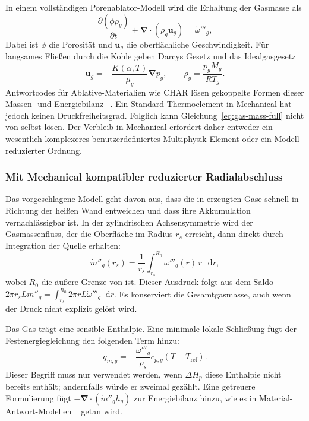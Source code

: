\documentclass[oneside,openany]{amsdtx}
\newcommand{\dd}{\mathop{}\!\mathrm{d}}
\newcommand{\pd}{\partial}
\newcommand{\vect}[1]{\bm{#1}}
\begin{document}
In einem vollständigen Porenablator-Modell wird die Erhaltung der Gasmasse als
\begin{equation}
  \frac{\pd(\phi\rho_g)}{\pd t}
  +\vect\nabla\cdot(\rho_g\vect u_g)=\dot\omega'''_g,
  \label{eq:gas-mass-full}
\end{equation}
Dabei ist \(\phi\) die Porosität und \(\vect u_g\) die oberflächliche Geschwindigkeit. Für langsames Fließen durch die Kohle geben Darcys Gesetz und das Idealgasgesetz
\begin{equation}
  \vect u_g=-\frac{K(\alpha,T)}{\mu_g}\vect\nabla p_g,
  \qquad
  \rho_g=\frac{p_g M_g}{R T_g}.
  \label{eq:darcy-ideal}
\end{equation}
Antwortcodes für Ablative-Materialien wie CHAR lösen gekoppelte Formen dieser Massen- und Energiebilanz ~\cite{amar2010,amar2016,ewing2013}. Ein Standard-Thermoelement in Mechanical hat jedoch keinen Druckfreiheitsgrad. Folglich kann  Gleichung~\eqref{eq:gas-mass-full} nicht von selbst lösen. Der Verbleib in Mechanical erfordert daher entweder ein wesentlich komplexeres benutzerdefiniertes Multiphysik-Element oder ein Modell reduzierter Ordnung.

\subsubsection{Mit Mechanical kompatibler reduzierter Radialabschluss}

Das vorgeschlagene Modell geht davon aus, dass die in  erzeugten Gase schnell in Richtung der heißen Wand entweichen und dass ihre Akkumulation vernachlässigbar ist. In der zylindrischen Achsensymmetrie wird der Gasmassenfluss, der die Oberfläche im Radius \(r_s\) erreicht, dann direkt durch Integration der Quelle erhalten:
\begin{equation}
  \boxed{\dot m''_g(r_s)=\frac{1}{r_s}
  \int_{r_s}^{R_0}\dot\omega'''_g(r)\,r\,\dd r,}
  \label{eq:radial-gas-flux}
\end{equation}
wobei \(R_0\) die äußere Grenze von  ist. Dieser Ausdruck folgt aus dem Saldo \(2\pi r_sL\dot m''_g=\int_{r_s}^{R_0}2\pi rL \dot\omega'''_g\dd r\). Es konserviert die Gesamtgasmasse, auch wenn der Druck nicht explizit gelöst wird.

Das Gas trägt eine sensible Enthalpie. Eine minimale lokale Schließung fügt der Festenergiegleichung den folgenden Term hinzu:
\begin{equation}
  \dot q_{m,g}=-\frac{\dot\omega'''_g}{\rho_s}
  c_{p,g}(T-T_\mathrm{ref}).
  \label{eq:gas-local-sink}
\end{equation}
Dieser Begriff muss nur verwendet werden, wenn \(\Delta H_p\) diese Enthalpie nicht bereits enthält; andernfalls würde er zweimal gezählt. Eine getreuere Formulierung fügt \(-\vect\nabla\cdot(\dot m''_g h_g)\) zur Energiebilanz hinzu, wie es in Material-Antwort-Modellen ~\cite{ewing2013,amar2010} getan wird.
\end{document}
